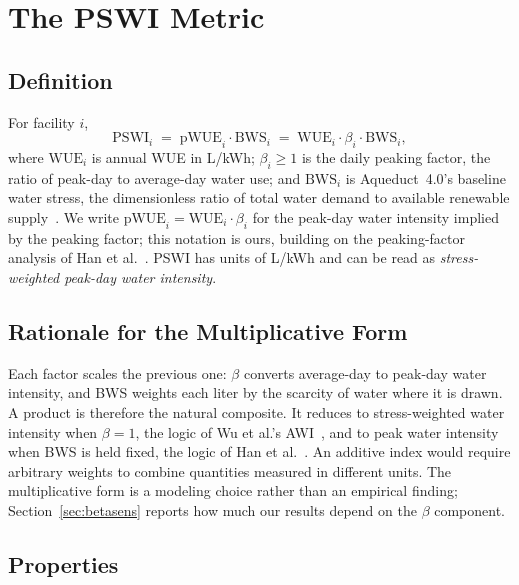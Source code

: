 \documentclass[conference,10pt]{IEEEtran}
\begin{document}
\section{The PSWI Metric}
\label{sec:metric}

\subsection{Definition}

For facility $i$,
\begin{equation}
\textrm{PSWI}_i \;=\; \textrm{pWUE}_i \cdot \textrm{BWS}_i
\;=\; \textrm{WUE}_i \cdot \beta_i \cdot \textrm{BWS}_i ,
\label{eq:pswi}
\end{equation}
where $\textrm{WUE}_i$ is annual WUE in L/kWh; $\beta_i \geq 1$ is the daily
peaking factor, the ratio of peak-day to average-day water use; and
$\textrm{BWS}_i$ is Aqueduct~4.0's baseline water stress, the dimensionless
ratio of total water demand to available renewable
supply~\cite{kuzma2023aqueduct}. We write
$\textrm{pWUE}_i = \textrm{WUE}_i \cdot \beta_i$ for the peak-day water
intensity implied by the peaking factor; this notation is ours, building on
the peaking-factor analysis of Han et al.~\cite{han2026}. PSWI has units of
L/kWh and can be read as \emph{stress-weighted peak-day water intensity}.

\subsection{Rationale for the Multiplicative Form}

Each factor scales the previous one: $\beta$ converts average-day to
peak-day water intensity, and BWS weights each liter by the scarcity of
water where it is drawn. A product is therefore the natural composite. It
reduces to stress-weighted water intensity when $\beta = 1$, the logic of
Wu et al.'s AWI~\cite{wu2025scarf}, and to peak water intensity when BWS is
held fixed, the logic of Han et al.~\cite{han2026}. An additive index would
require arbitrary weights to combine quantities measured in different
units. The multiplicative form is a modeling choice rather than an empirical
finding; Section~\ref{sec:betasens} reports how much our results depend on
the $\beta$ component.

\subsection{Properties}
\end{document}
